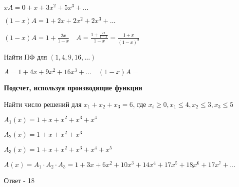 \documentclass[12pt]{article}
\begin{document}
    $xA = 0 + x + 3x^2 + 5x^3 + \dots$

    $(1 - x)A = 1 + 2x + 2x^2 + 2x^3 + \dots$

    $(1 - x)A = 1 + \frac{2x}{1 - x} \quad A = \frac{1 + \frac{2x}{1 - x}}{1 - x} = \frac{1 + x}{(1 - x)^2}$

    \Ex Найти ПФ для $(1, 4, 9, 16, \dots)$

    $A = 1 + 4x + 9x^2 + 16x^3 + \dots \quad (1 - x)A = $

    \item \textbf{Подсчет, используя производящие функции}

    Найти число решений для $x_1 + x_2 + x_3 = 6$, где $x_i \geq 0, x_1 \leq 4, x_2 \leq 3, x_3 \leq 5$

    $A_1(x) = 1 + x + x^2 + x^3 + x^4$

    $A_2(x) = 1 + x + x^2 + x^3$

    $A_3(x) = 1 + x + x^2 + x^3 + x^4 + x^5$

    $A(x) = A_1 \cdot A_2 \cdot A_3 = 1 + 3x + 6x^2 + 10x^3 + 14x^4 + 17x^5 + \underline{18x^6} + 17x^7 + \dots$

    Ответ - 18
\end{document}
